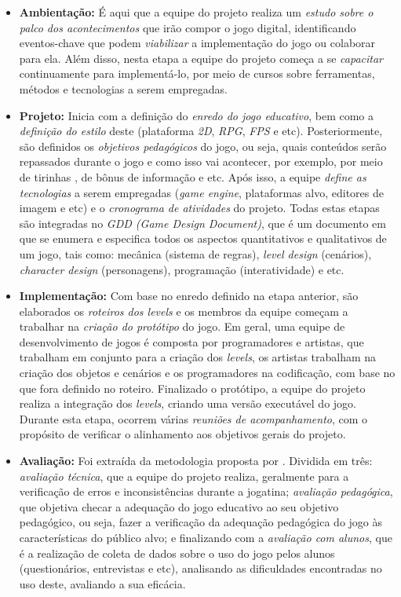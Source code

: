 \begin{itemize}

\item \textbf{Ambientação:} É aqui que a equipe do projeto realiza um \textit{estudo sobre o palco dos acontecimentos} que irão compor o jogo digital, identificando eventos-chave que podem \textit{viabilizar} a implementação do jogo ou colaborar para ela. Além disso, nesta etapa a equipe do projeto começa a se \textit{capacitar} continuamente para implementá-lo, por meio de cursos sobre ferramentas, métodos e tecnologias a serem empregadas.

\item \textbf{Projeto:} Inicia com a definição do \textit{enredo do jogo educativo}, bem como a \textit{definição do estilo} deste (plataforma \textit{2D}, \textit{RPG}, \textit{FPS} e etc). Posteriormente, são definidos os \textit{objetivos pedagógicos} do jogo, ou seja, quais conteúdos serão repassados durante o jogo e como isso vai acontecer, por exemplo, por meio de tirinhas \cite{bib:bb2016}, de bônus de informação \cite{bib:teixeira2016} e etc. Após isso, a equipe \textit{define as tecnologias} a serem empregadas (\textit{game engine}, plataformas alvo, editores de imagem e etc) e o \textit{cronograma de atividades} do projeto. Todas estas etapas são integradas no \textit{GDD (Game Design Document)}, que é um documento em que se enumera e especifica todos os aspectos quantitativos e qualitativos de um jogo, tais como: mecânica (sistema de regras), \textit{level design} (cenários), \textit{character design} (personagens), programação (interatividade) e etc.

\item \textbf{Implementação:} Com base no enredo definido na etapa anterior, são elaborados os \textit{roteiros dos levels} e os membros da equipe começam a trabalhar na \textit{criação do protótipo} do jogo. Em geral, uma equipe de desenvolvimento de jogos é composta por programadores e artistas, que trabalham em conjunto para a criação dos \textit{levels}, os artistas trabalham na criação dos objetos e cenários e os programadores na codificação, com base no que fora definido no roteiro. Finalizado o protótipo, a equipe do projeto realiza a integração dos \textit{levels}, criando uma versão executável do jogo. Durante esta etapa, ocorrem várias \textit{reuniões de acompanhamento}, com o propósito de verificar o alinhamento aos objetivos gerais do projeto.

\item \textbf{Avaliação:} Foi extraída da metodologia proposta por . Dividida em três: \textit{avaliação técnica}, que a equipe do projeto realiza, geralmente para a verificação de erros e inconsistências durante a jogatina; \textit{avaliação pedagógica}, que objetiva checar a adequação do jogo educativo ao seu objetivo pedagógico, ou seja, fazer a verificação da adequação pedagógica do jogo às características do público alvo; e finalizando com a \textit{avaliação com alunos}, que é a realização de coleta de dados sobre o uso do jogo pelos alunos (questionários, entrevistas e etc), analisando as dificuldades encontradas no uso deste, avaliando a sua eficácia.


\end{itemize}
